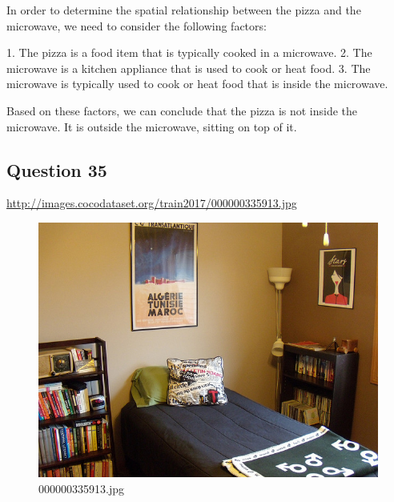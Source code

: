 \begin{enumerate}
        In order to determine the spatial relationship between the pizza and the microwave, we need to consider the following factors:
        
        1. The pizza is a food item that is typically cooked in a microwave.
        2. The microwave is a kitchen appliance that is used to cook or heat food.
        3. The microwave is typically used to cook or heat food that is inside the microwave.
        
        Based on these factors, we can conclude that the pizza is not inside the microwave. It is outside the microwave, sitting on top of it.
    \end{enumerate}
\subsection*{Question 35}
\url{http://images.cocodataset.org/train2017/000000335913.jpg}
    \begin{figure}[h]
        \centering
        \includegraphics[width=0.8\linewidth]{../image set/easy/000000335913.jpg}
        \caption{000000335913.jpg}
    \end{figure}
